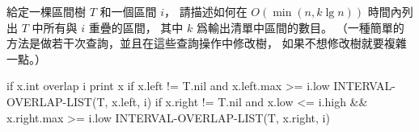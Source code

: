 \startEXERCISE
給定一棵區間樹 $T$ 和一個區間 $i$，
請描述如何在 $O(\min(n, k\lg n))$ 時間內列出 $T$ 中所有與 $i$ 重疊的區間，
其中 $k$ 爲輸出清單中區間的數目。
（\hint 一種簡單的方法是做若干次查詢，並且在這些查詢操作中修改樹，
如果不想修改樹就要複雜一點。）
\stopEXERCISE

\startANSWER
{}
\startCLRSCODE
if x.int overlap i
	print x
if x.left != T.nil and x.left.max >= i.low
	INTERVAL-OVERLAP-LIST(T, x.left, i)
if x.right != T.nil and x.low <= i.high && x.right.max >= i.low
	INTERVAL-OVERLAP-LIST(T, x.right, i)
\stopCLRSCODE
\stopANSWER
